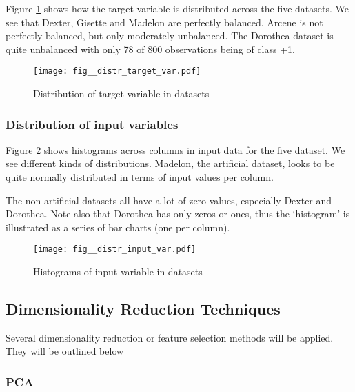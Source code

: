 \documentclass[12pt]{article}
\begin{document}
Figure \ref{fig:distr_target_var} shows how the target variable is distributed across the five datasets. We see that Dexter, Gisette and Madelon are perfectly balanced. Arcene is not perfectly balanced, but only moderately unbalanced. The Dorothea dataset is quite unbalanced with only 78 of 800 observations being of class +1.

\begin{figure}[h]
  \begin{center}
    \texttt{[image: fig\_\_distr\_target\_var.pdf]}
    \caption{\label{fig:distr_target_var} Distribution of target variable in datasets}
  \end{center}
\end{figure}

\subsubsection{Distribution of input variables}

Figure \ref{fig:distr_input_var} shows histograms across columns in input data for the five dataset. We see different kinds of distributions. Madelon, the artificial dataset, looks to be quite normally distributed in terms of input values per column.

The non-artificial datasets all have a lot of zero-values, especially Dexter and Dorothea. Note also that Dorothea has only zeros or ones, thus the `histogram' is illustrated as a series of bar charts (one per column).

\begin{figure}[h]
  \begin{center}
    \texttt{[image: fig\_\_distr\_input\_var.pdf]}
    \caption{\label{fig:distr_input_var} Histograms of input variable in datasets}
  \end{center}
\end{figure}

\subsection{Dimensionality Reduction Techniques}

Several dimensionality reduction or feature selection methods will be applied. They will be outlined below

\subsubsection{PCA}
\end{document}
